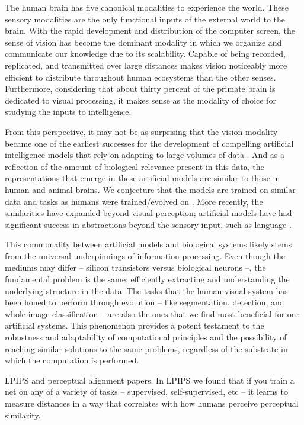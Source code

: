 \documentclass{article}
\theoremstyle{plain}
\theoremstyle{definition}
\theoremstyle{remark}
\begin{document}
The human brain has five canonical modalities to experience the world. These sensory modalities are the only functional inputs of the external world to the brain. With the rapid development and distribution of the computer screen, the sense of vision has become the dominant modality in which we organize and communicate our knowledge due to its scalability. Capable of being recorded, replicated, and transmitted over large distances makes vision noticeably more efficient to distribute throughout human ecosystems than the other senses. Furthermore, considering that about thirty percent of the primate brain is dedicated to visual processing, it makes sense as the modality of choice for studying the inputs to intelligence.

From this perspective, it may not be as surprising that the vision modality became one of the earliest successes for the development of compelling artificial intelligence models that rely on adapting to large volumes of data \cite{krizhevsky2017imagenet, russakovsky2015imagenet}. And as a reflection of the amount of biological relevance present in this data, the representations that emerge in these artificial models are similar to those in human and animal brains. We conjecture that the models are trained on similar data and tasks as humans were trained/evolved on \cite{yamins2014performance}. More recently, the similarities have expanded beyond visual perception; artificial models have had significant success in abstractions beyond the sensory input, such as language \cite{schrimpf2021neural, zhang2019bertscore}.

This commonality between artificial models and biological systems likely stems from the universal underpinnings of information processing. Even though the mediums may differ -- silicon transistors versus biological neurons --, the fundamental problem is the same: efficiently extracting and understanding the underlying structure in the data. The tasks that the human visual system has been honed to perform through evolution -- like segmentation, detection, and whole-image classification -- are also the ones that we find most beneficial for our artificial systems. This phenomenon provides a potent testament to the robustness and adaptability of computational principles and the possibility of reaching similar solutions to the same problems, regardless of the substrate in which the computation is performed.

LPIPS and perceptual alignment papers. In LPIPS we found that if you train a net on any of a variety of tasks -- supervised, self-supervised, etc -- it learns to measure distances in a way that correlates with how humans perceive perceptual similarity.
\end{document}
